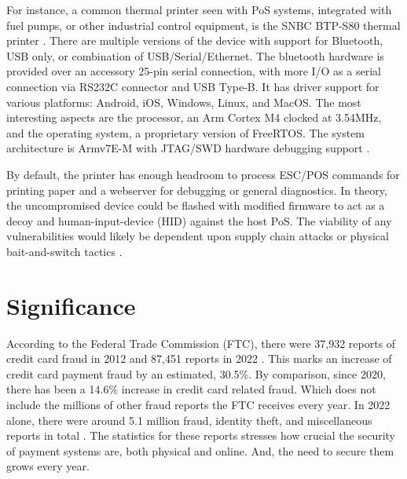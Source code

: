 For instance, a common thermal printer seen with PoS systems, integrated with fuel pumps, or other industrial control equipment, is the SNBC BTP-S80 thermal printer \autocite{SNBCBTPS80Thermala,SNBCNewBeiyangIntelligent}. There are multiple versions of the device with support for Bluetooth, USB only, or combination of USB/Serial/Ethernet. The bluetooth hardware is provided over an accessory 25-pin serial connection, with more I/O as a serial connection via RS232C connector and USB Type-B. It has driver support for various platforms: Android, iOS, Windows, Linux, and MacOS. The most interesting aspects are the processor, an Arm Cortex M4 clocked at 3.54MHz, and the operating system, a proprietary version of FreeRTOS. The system architecture is Armv7E-M with JTAG/SWD hardware debugging support \autocite{CortexM4,FreeRTOSMarketLeading}.

By default, the printer has enough headroom to process ESC/POS commands for printing paper and a webserver for debugging or general diagnostics. In theory, the uncompromised device could be flashed with modified firmware to act as a decoy and human-input-device (HID) against the host PoS. The viability of any vulnerabilities would likely be dependent upon supply chain attacks or physical bait-and-switch tactics \autocite{scaifeFearReaperCharacterization2018}.


\section{Significance}  \label{significance}

According to the Federal Trade Commission (FTC), there were 37,932 reports of credit card fraud in 2012 and 87,451 reports in 2022 \autocite{ConsumerSentinelNetwork2023,forthesentinelConsumerSentinelNetwork2022}. This marks an increase of credit card payment fraud by an estimated, 30.5\%. By comparison, since 2020, there has been a 14.6\% increase in credit card related fraud. Which does not include the millions of other fraud reports the FTC receives every year. In 2022 alone, there were around 5.1 million fraud, identity theft, and miscellaneous reports in total \autocite{ConsumerSentinelNetwork2023,forthesentinelConsumerSentinelNetwork2022}. The statistics for these reports stresses how crucial the security of payment systems are, both physical and online. And, the need to secure them grows every year.

